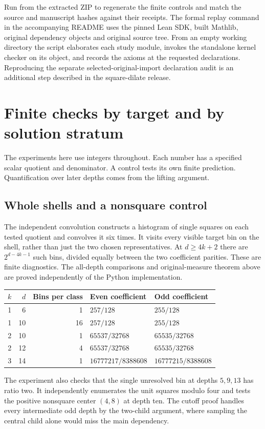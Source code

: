 \documentclass[12pt,letterpaper]{article}
\newcommand{\code}[1]{\texttt{\detokenize{#1}}}
\begin{document}
Run \code{python3 verify.py} from the extracted ZIP to regenerate the finite controls and match the source and manuscript hashes against their receipts. The formal replay command in the accompanying README uses the pinned Lean SDK, built Mathlib, original dependency objects and original source tree. From an empty working directory the script elaborates each study module, invokes the standalone kernel checker on its object, and records the axioms at the requested declarations. Reproducing the separate selected-original-import declaration audit is an additional step described in the square-dilate release.

\appendix
\section{Finite checks by target and by solution stratum}
The experiments here use integers throughout. Each number has a specified scalar quotient and denominator. A control tests its own finite prediction. Quantification over later depths comes from the lifting argument.
\subsection{Whole shells and a nonsquare control}
The independent convolution constructs a histogram of single squares on each tested quotient and convolves it six times. It visits every visible target bin on the shell, rather than just the two chosen representatives. At $d\geq4k+2$ there are $2^{d-4k-1}$ such bins, divided equally between the two coefficient parities. These are finite diagnostics. The all-depth comparisons and original-measure theorem above are proved independently of the Python implementation.

\begin{center}
\begin{tabular}{@{}r r r l l@{}}
\toprule
$k$ & $d$ & Bins per class & Even coefficient & Odd coefficient \\
\midrule
1 & 6  & 1  & $257/128$ & $255/128$ \\
1 & 10 & 16 & $257/128$ & $255/128$ \\
2 & 10 & 1  & $65537/32768$ & $65535/32768$ \\
2 & 12 & 4  & $65537/32768$ & $65535/32768$ \\
3 & 14 & 1  & $16777217/8388608$ & $16777215/8388608$ \\
\bottomrule
\end{tabular}
\end{center}
The experiment also checks that the single unresolved bin at depths $5,9,13$ has ratio two. It independently enumerates the unit squares modulo four and tests the positive nonsquare center $(4,8)$ at depth ten. The cutoff proof handles every intermediate odd depth by the two-child argument, where sampling the central child alone would miss the main dependency.
\end{document}
